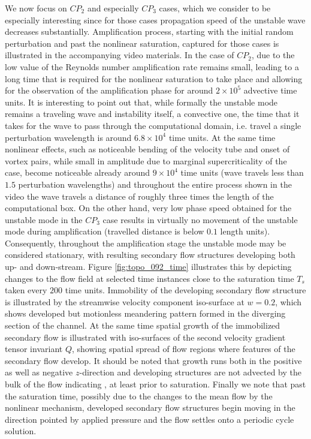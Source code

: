 \documentclass[lineno]{jfm}
\begin{document}
We now focus on $CP_2$ and especially $CP_3$ cases, which we consider to be especially interesting since for those cases propagation speed of the unstable wave decreases substantially.
Amplification process, starting with the initial random perturbation and past the nonlinear saturation, captured for those cases is illustrated in the accompanying video materials.
In the case of $CP_2$, due to the low value of the Reynolds number amplification rate remains small, leading to a long time that is required for the nonlinear saturation to take place and allowing for the observation of the amplification phase for around $2\times10^5$ advective time units.
It is interesting to point out that, while formally the unstable mode remains a traveling wave and instability itself, a convective one, the time that it takes for the wave to pass through the computational domain, i.e. travel a single perturbation wavelength is around $6.8\times10^4$ time units.
At the same time nonlinear effects, such as noticeable bending of the velocity tube and onset of vortex pairs, while small in amplitude due to marginal supercriticality of the case, become noticeable already around $9\times10^4$ time units (wave travels less than $1.5$ perturbation wavelengths) and
throughout the entire process shown in the video the wave travels a distance of roughly three times the length of the computational box.
On the other hand, very low phase speed obtained for the unstable mode in the $CP_3$ case results in virtually no movement of the unstable mode during amplification (travelled distance is below $0.1$ length units).
Consequently, throughout the amplification stage the unstable mode may be considered stationary, with resulting secondary flow structures developing both up- and down-stream.
Figure \ref{fig:topo_092_time} illustrates this by depicting changes to the flow field at selected time instances close to the saturation time $T_s$ taken every $200$ time units.
Immobility of the developing secondary flow structure is illustrated by the streamwise velocity component iso-surface at $w=0.2$, which shows developed but motionless meandering pattern formed in the diverging section of the channel. 
At the same time spatial growth of the immobilized secondary flow is illustrated with iso-surfaces of the second velocity gradient tensor invariant $Q$,
showing spatial spread of flow regions where features of the secondary flow develop.
It should be noted that   growth runs both in the positive as well as negative $z$-direction and developing structures are not advected by the bulk of the flow indicating  , at least prior to saturation.
Finally we note that past the saturation time, possibly due to the changes to the mean flow by the nonlinear mechanism, developed secondary flow structures begin moving in the direction pointed by applied pressure and the flow settles onto a periodic cycle solution. 
\end{document}
